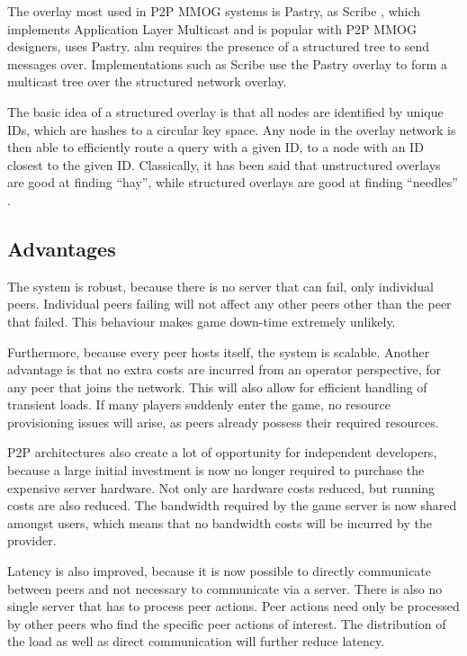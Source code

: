 \documentclass[10pt,a4paper,journal,cspaper,compsoc]{IEEEtran}
\begin{document}
The overlay most used in P2P MMOG systems is Pastry, as Scribe \cite{scribe}, which implements Application Layer Multicast and is popular with P2P
MMOG designers, uses Pastry. \ac{alm} requires the presence of a structured tree to send messages over. Implementations such as Scribe use the Pastry
overlay to form a multicast tree over the structured network overlay.

The basic idea of a structured overlay is that all nodes are identified by unique IDs, which are hashes to a circular key space. Any node in the
overlay network is then able to efficiently route a query with a given ID, to a node with an ID closest to the given ID. Classically, it has been
said that unstructured overlays are good at finding ``hay'', while structured overlays are good at finding ``needles''
\cite{Rodrigues_acm_comms_p2p}.

\subsection{Advantages}

The system is robust, because there is no server that can fail, only individual peers. Individual peers failing will not affect any other peers other
than the peer that failed. This behaviour makes game down-time extremely unlikely.

Furthermore, because every peer hosts itself, the system is scalable. Another advantage is that no extra costs are incurred from an operator
perspective, for any peer that joins the network. This will also allow for efficient handling of transient loads. If many players suddenly enter the
game, no resource provisioning issues will arise, as peers already possess their required resources.

\ac{P2P} architectures also create a lot of opportunity for independent developers, because a large initial investment is now no longer required to
purchase the expensive server hardware. Not only are hardware costs reduced, but running costs are also reduced. The bandwidth required by the game
server is now shared amongst users, which means that no bandwidth costs will be incurred by the provider.

Latency is also improved, because it is now possible to directly communicate between peers and not necessary to communicate via a server. There is
also no single server that has to process peer actions. Peer actions need only be processed by other peers who find the specific peer actions of
interest. The distribution of the load as well as direct communication will further reduce latency.
\end{document}
